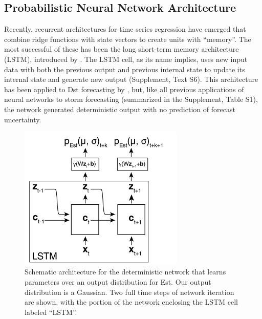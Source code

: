 \subsection{Probabilistic Neural Network Architecture}
Recently, recurrent architectures for time series regression have emerged that combine ridge functions with state vectors to create units with ``memory''. The most successful of these has been the long short-term memory architecture (LSTM), introduced by \cite{Hochreiter1997}. The LSTM cell, as its name implies, uses new input data with both the previous output and previous internal state to update its internal state and generate new output (Supplement, Text S6). This architecture has been applied to Dst forecasting by \cite{Gruet2018}, but, like all previous applications of neural networks to storm forecasting (summarized in the Supplement, Table S1), the network generated deterministic output with no prediction of forecast uncertainty.

\begin{figure}[htbp]
   \centering
   \includegraphics[width=0.7\textwidth]{figures/architecture_prob.pdf} %
   \caption{Schematic architecture for the deterministic network that learns parameters over an output distribution for Est. Our output distribution is a Gaussian. Two full time steps of network iteration are shown, with the portion of the network enclosing the LSTM cell labeled ``LSTM''.}
   \label{fig:architecture}
\end{figure}

